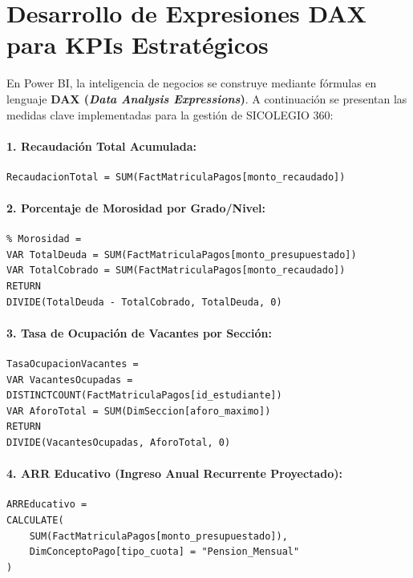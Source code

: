 \documentclass[12pt,a4paper,oneside]{report}
\begin{document}
\section{Desarrollo de Expresiones DAX para KPIs Estratégicos}

En Power BI, la inteligencia de negocios se construye mediante fórmulas en lenguaje \textbf{DAX (\textit{Data Analysis Expressions})}. A continuación se presentan las medidas clave implementadas para la gestión de SICOLEGIO 360:

\paragraph{1. Recaudación Total Acumulada:}
\begin{lstlisting}
RecaudacionTotal = SUM(FactMatriculaPagos[monto_recaudado])
\end{lstlisting}

\paragraph{2. Porcentaje de Morosidad por Grado/Nivel:}
\begin{lstlisting}
% Morosidad = 
VAR TotalDeuda = SUM(FactMatriculaPagos[monto_presupuestado])
VAR TotalCobrado = SUM(FactMatriculaPagos[monto_recaudado])
RETURN
DIVIDE(TotalDeuda - TotalCobrado, TotalDeuda, 0)
\end{lstlisting}

\paragraph{3. Tasa de Ocupación de Vacantes por Sección:}
\begin{lstlisting}
TasaOcupacionVacantes = 
VAR VacantesOcupadas = DISTINCTCOUNT(FactMatriculaPagos[id_estudiante])
VAR AforoTotal = SUM(DimSeccion[aforo_maximo])
RETURN
DIVIDE(VacantesOcupadas, AforoTotal, 0)
\end{lstlisting}

\paragraph{4. ARR Educativo (Ingreso Anual Recurrente Proyectado):}
\begin{lstlisting}
ARREducativo = 
CALCULATE(
    SUM(FactMatriculaPagos[monto_presupuestado]),
    DimConceptoPago[tipo_cuota] = "Pension_Mensual"
)
\end{lstlisting}
\end{document}
